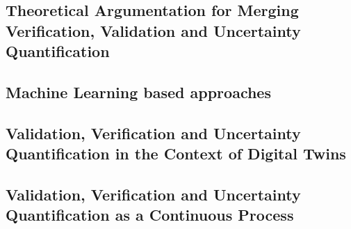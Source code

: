 \subsection{Theoretical Argumentation for Merging Verification, Validation and Uncertainty Quantification}

\subsection{Machine Learning based approaches}

\subsection{Validation, Verification and Uncertainty Quantification in the Context of Digital Twins}

\subsection{Validation, Verification and Uncertainty Quantification as a Continuous Process}



